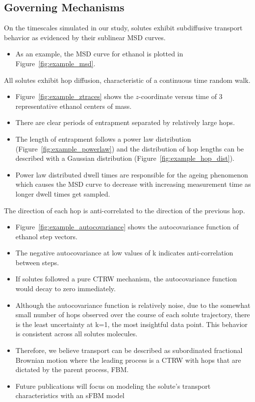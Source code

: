 \documentclass{article}
\begin{document}
  \subsection*{Governing Mechanisms}\label{section:mechanism_overview}  
  
  On the timescales simulated in our study, solutes exhibit subdiffusive
  transport behavior as evidenced by their sublinear MSD curves. 
  \begin{itemize}  
	\item As an example, the MSD curve for ethanol is plotted in 
	Figure~\ref{fig:example_msd}.
  \end{itemize}
  
  \noindent All solutes exhibit hop diffusion, characteristic of a continuous time random walk.
  \begin{itemize}
  	\item Figure~\ref{fig:example_ztraces} shows the $z$-coordinate versus time of
  	3 representative ethanol centers of mass.
  	\item There are clear periods of entrapment separated by relatively large hops.
  	\item The length of entrapment follows a power law distribution 
  	(Figure~\ref{fig:example_powerlaw}) and the distribution of hop lengths can be 
  	described with a Gaussian distribution (Figure~\ref{fig:example_hop_dist}).
  	\item Power law distributed dwell times are responsible for the ageing phenomenon
  	which causes the MSD curve to decrease with increasing measurement time as longer
  	dwell times get sampled.
  \end{itemize}
  
  \noindent The direction of each hop is anti-correlated to the direction of the previous hop.
  \begin{itemize}
  	\item Figure~\ref{fig:example_autocovariance} shows the autocovariance function of 
  	ethanol step vectors. %
  	\item The negative autocovariance at low values of k indicates anti-correlation
  	between steps. 
  	\item If solutes followed a pure CTRW mechanism, the autocovariance function would
  	decay to zero immediately.
  	\item Although the autocovariance function is relatively noise, due to the somewhat small
  	number of hops observed over the course of each solute trajectory, there is the least 
  	uncertainty at k=1, the most insightful data point. This behavior is consistent across
  	all solutes molecules.
  	\item Therefore, we believe transport can be described as subordinated fractional Brownian
  	motion where the leading process is a CTRW with hops that are dictated by the parent
  	process, FBM.
  	\item Future publications will focus on modeling the solute's transport characteristics
  	with an sFBM model
  \end{itemize}
\end{document}
